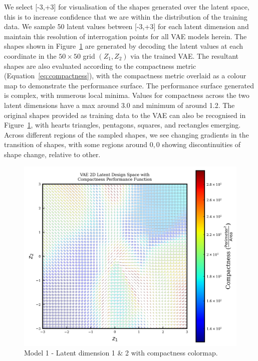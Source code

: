 \documentclass{article}
\begin{document}
We select [-3,+3] for visualisation of the shapes generated over the latent space, this is to increase confidence that we are within the distribution of the training data. We sample 50 latent values between [-3,+3] for each latent dimension and maintain this resolution of interrogation points for all VAE models herein. The shapes shown in Figure~\ref{fig:model1_latent_visualisation} are generated by decoding the latent values at each coordinate in the $50\times50$ grid $(Z_1,Z_2)$ via the trained VAE. The resultant shapes are also evaluated according to the compactness metric (Equation~\eqref{eq:compactness}), with the compactness metric overlaid as a colour map to demonstrate the performance surface. The performance surface generated is complex, with numerous local minima. Values for compactness across the two latent dimensions have a max around 3.0 and minimum of around 1.2. The original shapes provided as training data to the VAE can also be recognised in Figure~\ref{fig:model1_latent_visualisation}, with hearts triangles, pentagons, squares, and rectangles emerging. Across different regions of the sampled shapes, we see changing gradients in the transition of shapes, with some regions around $0,0$ showing discontinuities of shape change, relative to other.  

\begin{figure}[H]
    \centering
    \includegraphics[width=0.75\linewidth]{figures/VAEmodels/model1/latent_vis_1000epochs.png}
    \caption{Model 1 - Latent dimension 1 \& 2 with compactness colormap.}
    \label{fig:model1_latent_visualisation}
\end{figure}
\end{document}
